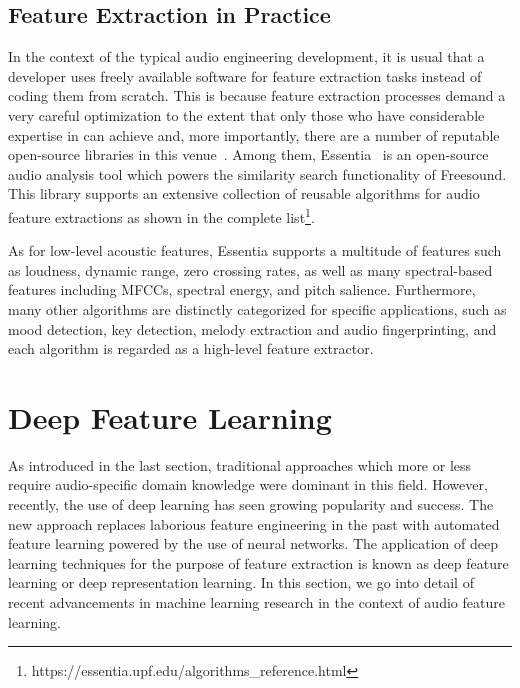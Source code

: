 \subsection{Feature Extraction in Practice}
In the context of the typical audio engineering development, it is usual that a developer uses freely available software for feature extraction tasks instead of coding them from scratch. This is because feature extraction processes demand a very careful optimization to the extent that only those who have considerable expertise in can achieve and, more importantly, there are a number of reputable open-source libraries in this venue~\cite{mcfee2015, giannakopoulos2015, bullock2007}. Among them, Essentia~\cite{bogdanov2013} is an open-source audio analysis tool which powers the similarity search functionality of Freesound. This library supports an extensive collection of reusable algorithms for audio feature extractions as shown in the complete list\footnote{https://essentia.upf.edu/algorithms\_reference.html}. 

As for low-level acoustic features, Essentia supports a multitude of features such as loudness, dynamic range, zero crossing rates, as well as many spectral-based features including MFCCs, spectral energy, and pitch salience. Furthermore, many other algorithms are distinctly categorized for specific applications, such as mood detection, key detection, melody extraction and audio fingerprinting, and each algorithm is regarded as a high-level feature extractor.

\section{Deep Feature Learning}

As introduced in the last section, traditional approaches which more or less require audio-specific domain knowledge were dominant in this field. However, recently, the use of deep learning has seen growing popularity and success. The new approach replaces laborious feature engineering in the past with automated feature learning powered by the use of neural networks. The application of deep learning techniques for the purpose of feature extraction is known as deep feature learning or deep representation learning. In this section, we go into detail of recent advancements in machine learning research in the context of audio feature learning.

